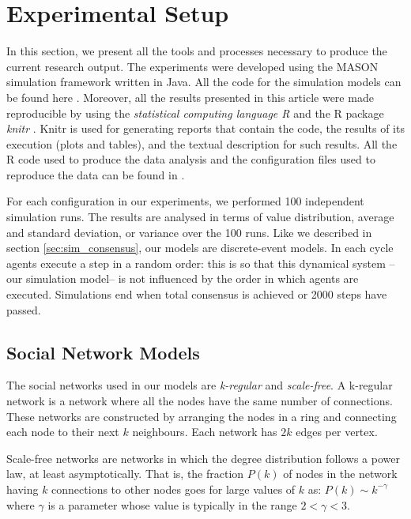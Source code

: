 \documentclass[preprint,number]{elsarticle}
\begin{document}
	\section{Experimental Setup}
	\label{sec:experimental-setup}
        \noindent In this section, we present all the tools and processes necessary to produce the
        current research output. The experiments were developed using the MASON~\cite{Luke2005}
        simulation framework written in Java. All the code for the simulation models can be found
        here \cite{Nunes:Software:11067}. Moreover, all the results presented in this article were
        made reproducible by using the \textit{statistical computing language R} \cite{R2008} and
        the R package \textit{knitr} \cite{knitr2014}. Knitr is used for generating reports that
        contain the code, the results of its execution (plots and tables), and the textual
        description for such results. All the R code used to produce the data analysis and the
        configuration files used to reproduce the data can be found in
        \cite{NunesAntunes2014:Analysis:11898}.

        For each configuration in our experiments, we performed 100 independent simulation runs. The
        results are analysed in terms of value distribution, average and standard deviation, or
        variance over the 100 runs. Like we described in section \ref{sec:sim_consensus}, our models
        are discrete-event models. In each cycle agents execute a step in a random order: this is so
        that this dynamical system --our simulation model-- is not influenced by the order in which
        agents are executed. Simulations end when total consensus is achieved or 2000 steps have
        passed.

        \subsection{Social Network Models}
        \label{sec:exp-setup_network_models}
        \noindent The social networks used in our models are \textit{k-regular} and
        \textit{scale-free}. A k-regular network is a network where all the nodes have the same
        number of connections. These networks are constructed by arranging the nodes in a ring and
        connecting each node to their next $k$ neighbours. Each network has $2k$ edges per vertex.

        Scale-free networks are networks in which the degree distribution follows a power law, at
        least asymptotically. That is, the fraction $P(k)$ of nodes in the network having $k$
        connections to other nodes goes for large values of $k$ as: $ P(k) \sim k^{-\gamma}$ where
        $\gamma$ is a parameter whose value is typically in the range $2 < \gamma < 3$.
\end{document}
